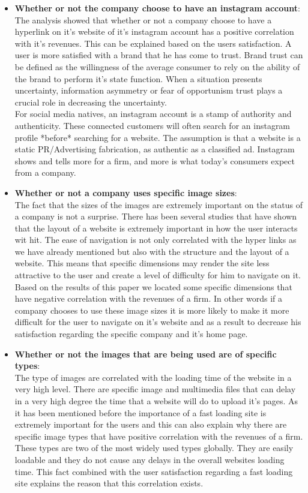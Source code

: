 \documentclass{article}
\begin{document}
\begin{itemize}
\item \textbf{ Whether or not the company choose to have an instagram account}: \\
The analysis showed that whether or not a company choose to have a hyperlink on it's website of it's instagram account has a positive correlation with it's revenues. This can be explained based on the users satisfaction. A user is more satisfied with a brand that he has come to trust. Brand trust can be defined\cite{key55} as the willingness of the average consumer to rely on the ability of the brand to perform it's state function. When a situation presents uncertainty, information asymmetry or fear of opportunism trust plays a crucial role in decreasing the uncertainty. \\
For social media natives, an instagram account is a stamp of authority and authenticity. These connected customers will often search for an instagram profile *before* searching for a website. The assumption is that a website is a static PR/Advertising fabrication, as authentic as a classified ad.  Instagram shows and tells more for a firm, and more is what today’s consumers expect from a company.
\item \textbf{Whether or not a company uses specific image sizes}:\\
The fact that the sizes of the images are extremely important on the status of a company is not a surprise. There has been several studies that have shown that the layout of a website is extremely important in how the user interacts wit hit. The ease of navigation is not only correlated with the hyper links as we have already mentioned but also with the structure and the layout of a website. This means that specific dimensions may render the site less attractive to the user and create a level of difficulty for him to navigate on it.\\
Based on the results of this paper we located some specific dimensions that have negative correlation with the revenues of a firm. In other words if a company chooses to use these image sizes it is more likely to make it more difficult for the user to navigate on it's website and as a result to decrease his satisfaction regarding the specific company and it's home page.   
\item \textbf{Whether or not the images that are being used are of specific types}:\\
The type of images are correlated with the loading time of the website in a very high level. There are specific image and multimedia files that can delay in a very high degree the time that a website will do to upload it's pages. As it has been mentioned before the importance of a fast loading site is extremely important for the users and this can also explain why there are specific image types that have positive correlation with the revenues of a firm.\\
These types are two of the most widely used types globally. They are easily loadable and they do not cause any delays in the overall websites loading time. This fact combined with the user satisfaction regarding a fast loading site explains the reason that this correlation exists.
\end{itemize}
\end{document}
